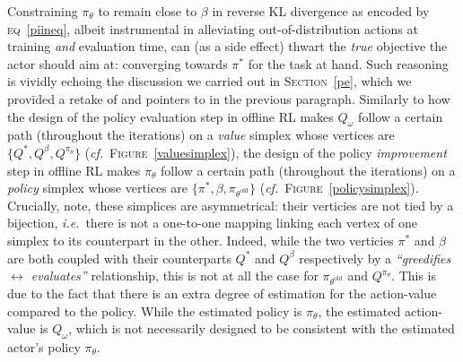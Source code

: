 Constraining $\pi_\theta$ to remain close to $\beta$ in reverse KL divergence
as encoded by \textsc{eq}~\ref{piineq}, albeit instrumental in alleviating out-of-distribution actions
at training \emph{and} evaluation time, can (as a side effect) thwart the \emph{true} objective
the actor should aim at: converging towards $\pi^*$ for the task at hand.
Such reasoning is vividly echoing the discussion we carried out in \textsc{Section}~\ref{pe},
which we provided a retake of and pointers to in the previous paragraph.
Similarly to how the design of the policy evaluation step in offline RL makes $Q_\omega$ follow a certain path
(throughout the iterations) on a \textit{value} simplex whose vertices are
$\{
Q^*, Q^\beta, Q^{\pi_\theta}
\}$ (\textit{cf.}~\textsc{Figure}~\ref{valuesimplex}),
the design of the policy \emph{improvement} step in offline RL makes $\pi_\theta$ follow a certain path
(throughout the iterations) on a \textit{policy} simplex whose vertices are
$\{
\pi^*, \beta, \pi_{\theta^\text{old}}
\}$ (\textit{cf.}~\textsc{Figure}~\ref{policysimplex}).
Crucially, note, these simplices are asymmetrical: their verticies are not tied by a bijection,
\textit{i.e.}~there is not a one-to-one mapping linking each vertex of one simplex to its counterpart in the other.
Indeed, while the two verticies $\pi^*$ and $\beta$ are both coupled with their counterparts $Q^*$ and
$Q^\beta$ respectively by a \textit{``greedifies $\leftrightarrow$ evaluates''} relationship,
this is not at all the case for $\pi_{\theta^\text{old}}$ and $Q^{\pi_\theta}$.
This is due to the fact that there is an extra degree of estimation for the action-value compared to the policy.
While the estimated policy is $\pi_\theta$, the estimated action-value is $Q_\omega$, which is not necessarily
designed to be consistent with the estimated actor's policy $\pi_\theta$.

